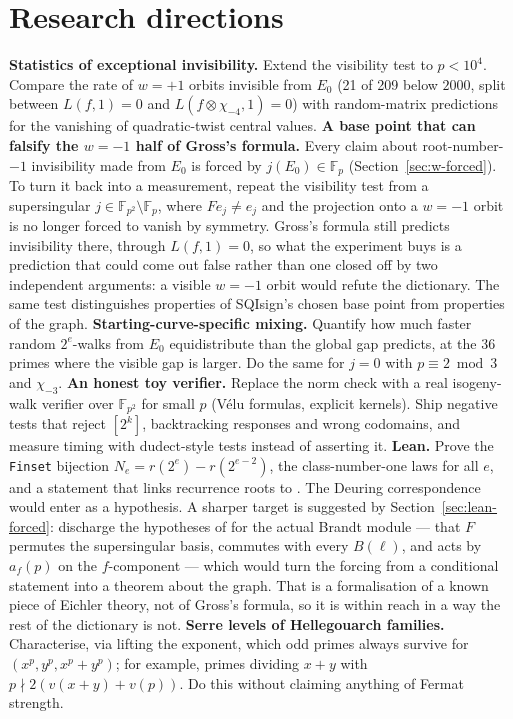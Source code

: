 \documentclass[11pt,a4paper]{article}
\theoremstyle{definition}
\newcommand{\lean}[1]{\path{#1}}
\begin{document}
\section{Research directions}
\label{sec:directions}
\textbf{Statistics of exceptional invisibility.} Extend the visibility test to $p<10^4$. Compare the rate of $w=+1$ orbits invisible from $E_0$ (21 of 209 below $2000$, split between $L(f,1)=0$ and $L(f\otimes\chi_{-4},1)=0$) with random-matrix predictions for the vanishing of quadratic-twist central values.
\textbf{A base point that can falsify the $w=-1$ half of Gross's formula.} Every claim about root-number-$-1$ invisibility made from $E_0$ is forced by $j(E_0)\in\mathbb F_p$ (Section~\ref{sec:w-forced}). To turn it back into a measurement, repeat the visibility test from a supersingular $j\in\mathbb F_{p^2}\setminus\mathbb F_p$, where $Fe_j\ne e_j$ and the projection onto a $w=-1$ orbit is no longer forced to vanish by symmetry. Gross's formula still predicts invisibility there, through $L(f,1)=0$, so what the experiment buys is a prediction that could come out false rather than one closed off by two independent arguments: a visible $w=-1$ orbit would refute the dictionary. The same test distinguishes properties of SQIsign's chosen base point from properties of the graph.
\textbf{Starting-curve-specific mixing.} Quantify how much faster random $2^e$-walks from $E_0$ equidistribute than the global gap predicts, at the 36 primes where the visible gap is larger. Do the same for $j=0$ with $p\equiv2\bmod3$ and $\chi_{-3}$.
\textbf{An honest toy verifier.} Replace the norm check with a real isogeny-walk verifier over $\mathbb F_{p^2}$ for small $p$ (V\'elu formulas, explicit kernels). Ship negative tests that reject $[2^k]$, backtracking responses and wrong codomains, and measure timing with dudect-style tests instead of asserting it.
\textbf{Lean.} Prove the \texttt{Finset} bijection $N_e=r(2^e)-r(2^{e-2})$, the class-number-one laws for all $e$, and a statement that links recurrence roots to \lean{ihara_circle}. The Deuring correspondence would enter as a hypothesis. A sharper target is suggested by Section~\ref{sec:lean-forced}: discharge the hypotheses of \lean{frobenius_forces_vanishing} for the actual Brandt module --- that $F$ permutes the supersingular basis, commutes with every $B(\ell)$, and acts by $a_f(p)$ on the $f$-component --- which would turn the forcing from a conditional statement into a theorem about the graph. That is a formalisation of a known piece of Eichler theory, not of Gross's formula, so it is within reach in a way the rest of the dictionary is not.
\textbf{Serre levels of Hellegouarch families.} Characterise, via lifting the exponent, which odd primes always survive for $(x^p,y^p,x^p+y^p)$; for example, primes dividing $x+y$ with $p\nmid2(v(x+y)+v(p))$. Do this without claiming anything of Fermat strength.
\end{document}
